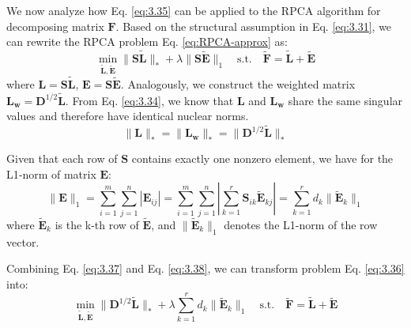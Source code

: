 \documentclass[runningheads]{llncs}
\begin{document}
We now analyze how Eq. \eqref{eq:3.35} can be applied to the RPCA algorithm for decomposing matrix $\mathbf{F}$. Based on the structural assumption in Eq. \eqref{eq:3.31}, we can rewrite the RPCA problem Eq. \eqref{eq:RPCA-approx} as:
\begin{equation}
    \min_{\tilde{\mathbf{L}}, \tilde{\mathbf{E}}} \|\mathbf{S} \tilde{\mathbf{L}}\|_* + \lambda \|\mathbf{S} \tilde{\mathbf{E}}\|_1 \quad \text{s.t.} \quad \tilde{\mathbf{F}} = \tilde{\mathbf{L}} + \tilde{\mathbf{E}}
    \label{eq:3.36}
\end{equation}
where $\mathbf{L} = \mathbf{S}\tilde{\mathbf{L}}$, $\mathbf{E} = \mathbf{S}\tilde{\mathbf{E}}$. Analogously, we construct the weighted matrix $\mathbf{L_w}=\mathbf{D}^{1/2} \tilde{\mathbf{L}}$. From Eq. \eqref{eq:3.34}, we know that $\mathbf{L}$ and $\mathbf{L_w}$ share the same singular values and therefore have identical nuclear norms.
\begin{equation}
    \|\mathbf{L}\|_* = \|\mathbf{L_w}\|_* = \|\mathbf{D}^{1/2} \tilde{\mathbf{L}}\|_*
    \label{eq:3.37}
\end{equation}

Given that each row of $\mathbf{S}$ contains exactly one nonzero element, we have for the L1‑norm of matrix $\mathbf{E}$:
\begin{equation}
    \|\mathbf{E}\|_1 = \sum_{i=1}^m \sum_{j=1}^n |\mathbf{E}_{ij}| = \sum_{i=1}^m \sum_{j=1}^n \left| \sum_{k=1}^r \mathbf{S}_{ik} \tilde{\mathbf{E}}_{kj} \right| = \sum_{k=1}^r d_k \|\tilde{\mathbf{E}}_{k}\|_1
    \label{eq:3.38}
\end{equation}
where $\tilde{\mathbf{E}}_{k}$ is the k-th row of $\tilde{\mathbf{E}}$, and $\|\tilde{\mathbf{E}}_{k}\|_1$ denotes the L1-norm of the row vector.

Combining Eq. \eqref{eq:3.37} and Eq. \eqref{eq:3.38}, we can transform problem Eq. \eqref{eq:3.36} into:
\begin{equation}
    \min_{\tilde{\mathbf{L}}, \tilde{\mathbf{E}}} \|\mathbf{D}^{1/2} \tilde{\mathbf{L}}\|_* + \lambda \sum_{k=1}^r d_k \|\tilde{\mathbf{E}}_{k}\|_1 \quad \text{s.t.} \quad \tilde{\mathbf{F}} = \tilde{\mathbf{L}} + \tilde{\mathbf{E}}
    \label{eq:3.39}
\end{equation}
\end{document}
